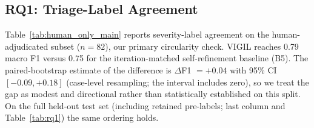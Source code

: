 \subsection{RQ1: Triage-Label Agreement}

Table~\ref{tab:human_only_main} reports severity-label agreement on the human-adjudicated subset ($n{=}82$), our primary circularity check. VIGIL reaches 0.79 macro F1 versus 0.75 for the iteration-matched self-refinement baseline (B5). The paired-bootstrap estimate of the difference is $\Delta$F1 ${=}{+}0.04$ with 95\% CI $[{-}0.09,{+}0.18]$ (case-level resampling; the interval includes zero), so we treat the gap as modest and directional rather than statistically established on this split. On the full held-out test set (including retained pre-labels; last column and Table~\ref{tab:rq1}) the same ordering holds.

\begin{table}[t]
\centering
\caption{Macro severity-label agreement. F1/P/R are on the human-adjudicated test subset ($n{=}82$; primary result). $\pm$ denotes half-widths of 95\% percentile bootstrap CIs for each system's \emph{marginal} macro-F1 (case-level resampling, $10{,}000$ resamples). The last column is F1 on the full held-out test set, which includes retained pre-labels (Table~\ref{tab:rq1}).}
\label{tab:human_only_main}
\small
\setlength{\tabcolsep}{3pt}
\end{table}

